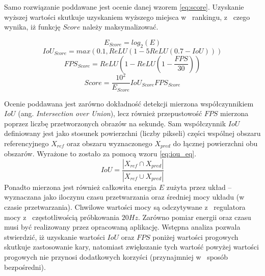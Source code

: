 Samo rozwiązanie poddawane jest ocenie danej wzorem \eqref{eq:score}. Uzyskanie wyższej wartości skutkuje uzyskaniem wyższego miejsca w~ rankingu, z~ czego wynika, iż funkcję $Score$ należy maksymalizować. 

\begin{equation}
E_{Score} = log_2(E)
\label{eq:e_score}
\end{equation}
\begin{equation}
IoU_{Score} = max(0.1, ReLU(1 - 5 ReLU(0.7 - IoU)))
\label{eq:iou_score}
\end{equation}
\begin{equation}
FPS_{Score} = ReLU(1 - ReLU( 1 - \frac{FPS}{30}))
\label{eq:fps_score}
\end{equation}
\begin{equation}
Score = \frac{10^2}{E_{Score}} IoU_{Score} FPS_{Score}
\label{eq:score}
\end{equation}

Ocenie poddawana jest zarówno dokładność detekcji mierzona współczynnikiem $IoU$ (ang. \emph{Intersection over Union}), lecz również przepustowość $FPS$ mierzona poprzez liczbę przetworzonych obrazów na sekundę.
Sam współczynnik $IoU$ definiowany jest jako stosunek powierzchni (liczby pikseli) części wspólnej obszaru referencyjnego $X_{ref}$ oraz obszaru wyznaczonego $X_{pred}$ do łącznej powierzchni obu obszarów. Wyrażone to zostało za pomocą wzoru \eqref{eq:iou_eq}.
\begin{equation}
IoU = \frac{|X_{ref} \cap X_{pred}|}{|X_{ref} \cup X_{pred}|}
\label{eq:iou_eq}
\end{equation}
Ponadto mierzona jest również całkowita energia $E$ zużyta przez układ -- wyznaczana jako iloczynu czasu przetwarzania oraz średniej mocy układu (w czasie przetwarzania). 
Chwilowe wartości mocy są odczytywane z~ regulatora mocy z~ częstotliwością próbkowania $20 Hz$.
Zarówno pomiar energii oraz czasu musi być realizowany przez opracowaną aplikację.
Wstępna analiza pozwala stwierdzić, iż uzyskanie wartości $IoU$ oraz $FPS$ poniżej wartości progowych skutkuje zastosowanie kary, natomiast
zwiększanie tych wartość powyżej wartości progowych nie przynosi dodatkowych korzyści (przynajmniej w~ sposób bezpośredni). 


